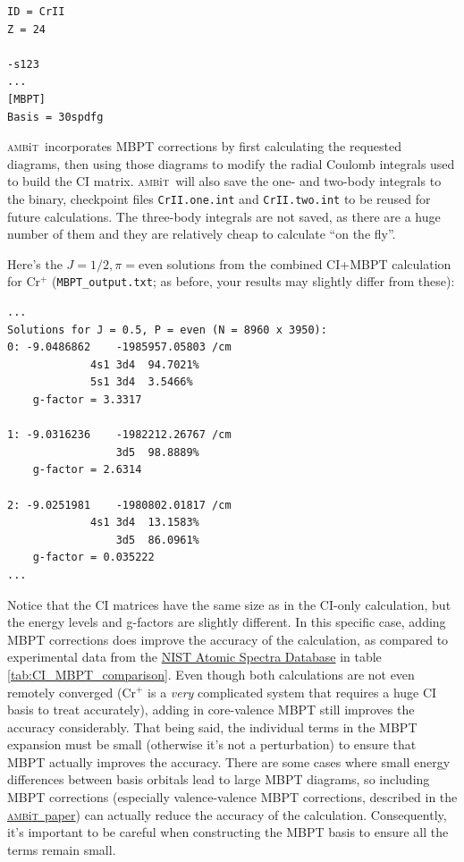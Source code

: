 \documentclass{report}
\newcommand{\ambit}{\textsc{amb}{\footnotesize i}\textsc{t}}
\begin{document}
\begin{verbatim}
ID = CrII
Z = 24

-s123
...
[MBPT]
Basis = 30spdfg
\end{verbatim}

\ambit\  incorporates MBPT corrections by first calculating the requested diagrams, then using those
diagrams to modify the radial Coulomb integrals used to build the CI matrix. \ambit\  will also save the
one- and two-body integrals to the binary, checkpoint files \texttt{CrII.one.int} and
\texttt{CrII.two.int} to be reused for future calculations. The three-body integrals are not saved,
as there are a huge number of them and they are relatively cheap to calculate ``on the fly''.

Here's the $J = 1/2, \pi = $even solutions from the combined CI+MBPT calculation for Cr$^+$ (\texttt{MBPT\_output.txt}; as before, 
your results may slightly differ from these):

\begin{verbatim}
...
Solutions for J = 0.5, P = even (N = 8960 x 3950):
0: -9.0486862    -1985957.05803 /cm
             4s1 3d4  94.7021%
             5s1 3d4  3.5466%
    g-factor = 3.3317

1: -9.0316236    -1982212.26767 /cm
                 3d5  98.8889%
    g-factor = 2.6314

2: -9.0251981    -1980802.01817 /cm
             4s1 3d4  13.1583%
                 3d5  86.0961%
    g-factor = 0.035222
...
\end{verbatim}

Notice that the CI matrices have the same size as in the CI-only calculation, but the energy levels and
g-factors are slightly different. In this specific case, adding MBPT corrections does improve the
accuracy of the calculation, as compared to experimental data from the 
\href{https://physics.nist.gov/PhysRefData/ASD/levels_form.html}{NIST Atomic Spectra Database} in table
\ref{tab:CI_MBPT_comparison}. Even though both calculations are not even remotely converged (Cr$^+$ is a
\emph{very} complicated system that requires a huge CI basis to treat accurately), adding in
core-valence MBPT still improves the accuracy considerably. That being
said, the individual terms in the MBPT expansion must be small (otherwise it's not a perturbation) to
ensure that MBPT actually improves the accuracy. There are some cases where small energy differences
between basis orbitals lead to large MBPT diagrams, so including MBPT corrections (especially
valence-valence MBPT corrections, described in the \href{https://arxiv.org/abs/1805.11265}
{\ambit\ paper}) can
actually reduce the accuracy of the calculation. Consequently, it's important to be careful when 
constructing the MBPT basis to ensure all the terms remain small.
\end{document}

